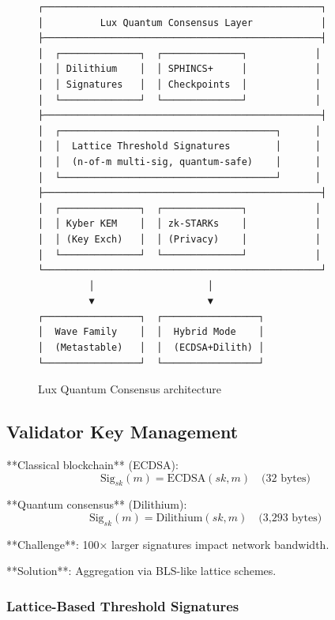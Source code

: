 \documentclass[11pt,letterpaper]{article}
\begin{document}
\begin{figure}[h]
\centering
\begin{verbatim}
┌─────────────────────────────────────────────────┐
│          Lux Quantum Consensus Layer            │
├─────────────────────────────────────────────────┤
│  ┌──────────────┐  ┌──────────────┐            │
│  │ Dilithium    │  │ SPHINCS+     │            │
│  │ Signatures   │  │ Checkpoints  │            │
│  └──────────────┘  └──────────────┘            │
├─────────────────────────────────────────────────┤
│  ┌──────────────────────────────────────┐      │
│  │  Lattice Threshold Signatures        │      │
│  │  (n-of-m multi-sig, quantum-safe)    │      │
│  └──────────────────────────────────────┘      │
├─────────────────────────────────────────────────┤
│  ┌──────────────┐  ┌──────────────┐            │
│  │ Kyber KEM    │  │ zk-STARKs    │            │
│  │ (Key Exch)   │  │ (Privacy)    │            │
│  └──────────────┘  └──────────────┘            │
└─────────────────────────────────────────────────┘
         │                    │
         ▼                    ▼
┌─────────────────┐  ┌─────────────────┐
│  Wave Family    │  │  Hybrid Mode    │
│  (Metastable)   │  │  (ECDSA+Dilith) │
└─────────────────┘  └─────────────────┘
\end{verbatim}
\caption{Lux Quantum Consensus architecture}
\end{figure}

\subsection{Validator Key Management}

**Classical blockchain** (ECDSA):
\begin{equation}
\text{Sig}_{sk}(m) = \text{ECDSA}(sk, m) \quad \text{(32 bytes)}
\end{equation}

**Quantum consensus** (Dilithium):
\begin{equation}
\text{Sig}_{sk}(m) = \text{Dilithium}(sk, m) \quad \text{(3,293 bytes)}
\end{equation}

**Challenge**: 100× larger signatures impact network bandwidth.

**Solution**: Aggregation via BLS-like lattice schemes.

\subsubsection{Lattice-Based Threshold Signatures}
\end{document}
